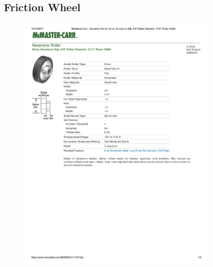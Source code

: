 \documentclass[../main.tex]{subfiles}
\begin{document}
\subsection{Friction Wheel \cite{FrictionWheel}} \label{FrictionWheel}
\begin{figure}[H]
	\centering
	\includegraphics[width=0.9\textwidth]{img/specs/Friction-Wheel-Specs.pdf}
\end{figure}

\end{document}
